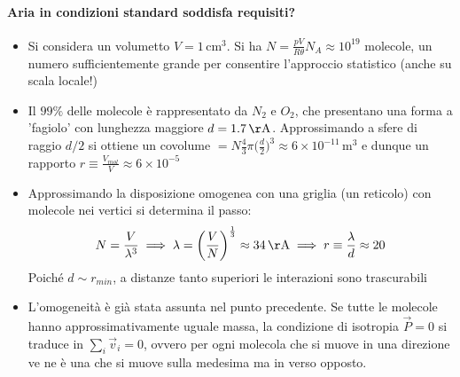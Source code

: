 \documentclass[10pt, oneside]{book}
\newcommand{\angstrom}{\, \mathrm{\AA}}
\newcommand{\meters}[2]{\, \mathrm{#1 m^{#2}}}
\begin{document}
\paragraph{Aria in condizioni standard soddisfa requisiti?} 
\begin{itemize}
\item Si considera un volumetto $V = 1 \, \mathrm{cm^3}$. Si ha $\displaystyle N = \frac{pV}{R \theta} N_A \approx 10^{19}$ molecole, un numero sufficientemente grande per consentire l'approccio statistico (anche su scala locale!)
\item Il $99 \% $ delle molecole è rappresentato da $N_2$ e $O_2$, che presentano una forma a 'fagiolo' con lunghezza maggiore $d = 1.7 \angstrom$. Approssimando a sfere di raggio $d/2$ si ottiene un covolume $\displaystyle = N \frac{4}{3}\pi \bigg(\displaystyle \frac{d}{2}\bigg)^3 \approx 6 \times 10^{-11} \meters{}{3}$ e dunque un rapporto $\displaystyle r \equiv \frac{V_{mol}}{V} \approx 6 \times 10^{-5}$
\item Approssimando la disposizione omogenea con una griglia (un reticolo) con molecole nei vertici si determina il passo:
\[N = \frac{V}{\lambda^3} \implies \lambda = \bigg(\frac{V}{N}\bigg)^{\frac{1}{3}} \approx 34 \angstrom \implies r \equiv \frac{\lambda}{d} \approx 20\]
Poiché $d \sim r_{min}$, a distanze tanto superiori le interazioni sono trascurabili
\item L'omogeneità è già stata assunta nel punto precedente. Se tutte le molecole hanno approssimativamente uguale massa, la condizione di isotropia $\vec{P} = 0$ si traduce in $\displaystyle \sum_i \vec{v}_i = 0$, ovvero per ogni molecola che si muove in una direzione ve ne è una che si muove sulla medesima ma in verso opposto. 
\end{itemize}
\end{document}
